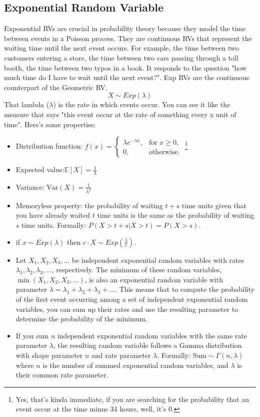 \documentclass[a4paper]{article}
\begin{document}
\subsection{Exponential Random Variable}
Exponential RVs are crucial in probability theory because they model the time between events in a Poisson process. They are continuous RVs that represent the waiting time until the next event occurs.
For example, the time between two customers entering a store, the time between two cars passing through a toll booth, the time between two typos in a book.
It responds to the question "how much time do I have to wait until the next event?".
Exp RVs are the continuous counterpart of the Geometric RV.
$$X \sim Exp(\lambda)$$
That lambda ($\lambda$) is the rate in which events occur. You can see it like the measure that says "this event occur at the rate of something every x unit of time". Here's some properties:  
\begin{itemize}
    \item Distribution function: $f(x) = \begin{cases} \lambda e^{-\lambda x}, & \text{for } x \geq 0, \\ 0, & \text{otherwise}. \end{cases}$   \footnote{Yes, that's kinda immediate, if you are searching for the probability that an event occur at the time minus 34 hours, well, it's 0.}
    \item Expected value:$\mathbb{E}[X] = \frac{1}{\lambda}$
    \item Variance: $\text{Var}(X) = \frac{1}{\lambda^2}$
    \item Memoryless property: the probability of waiting $t + s$ time units given that you have already waited $t$ time units is the same as the probability of waiting $s$ time units. Formally: $P(X > t + s | X > t) = P(X > s)$.
    \item if $x\sim Exp(\lambda)$ then $c\cdot X \sim Exp(\frac{\lambda}{c})$.
    \item Let \( X_1, X_2, X_3, \dots \) be independent exponential random variables with rates \( \lambda_1, \lambda_2, \lambda_3, \dots \), respectively. The minimum of these random variables, \( \min(X_1, X_2, X_3, \dots) \), is also an exponential random variable with parameter \( \lambda = \lambda_1 + \lambda_2 + \lambda_3 + \dots \). This means that to compute the probability of the first event occurring among a set of independent exponential random variables, you can sum up their rates and use the resulting parameter to determine the probability of the minimum.
    \item If you sum \(n\) independent exponential random variables with the same rate parameter \(\lambda\), the resulting random variable follows a Gamma distribution with shape parameter \(n\) and rate parameter \(\lambda\). Formally: $ \text{Sum} \sim \Gamma(n, \lambda)$ 
    where \(n\) is the number of summed exponential random variables, and \(\lambda\) is their common rate parameter.
\end{itemize}
\end{document}
